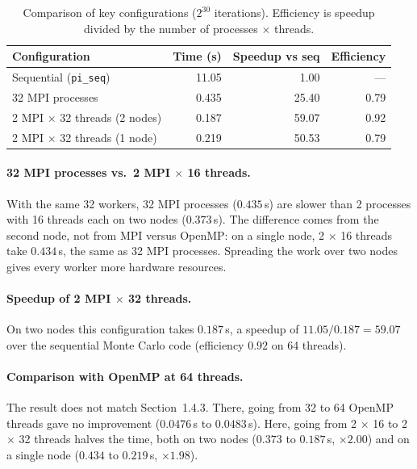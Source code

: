 \documentclass[11pt,a4paper]{article}
\begin{document}
\begin{table}[H]
\centering
\begin{tabular}{lrrr}
\toprule
\textbf{Configuration} & \textbf{Time (s)} & \textbf{Speedup vs seq} & \textbf{Efficiency} \\
\midrule
Sequential (\texttt{pi\_seq})              & 11.05  & 1.00  & --- \\
32 MPI processes                           &  0.435 & 25.40 & 0.79 \\
2 MPI $\times$ 32 threads (2 nodes)        &  0.187 & 59.07 & 0.92 \\
2 MPI $\times$ 32 threads (1 node)         &  0.219 & 50.53 & 0.79 \\
\bottomrule
\end{tabular}
\caption{Comparison of key configurations ($2^{30}$ iterations). Efficiency is speedup divided by the number of processes $\times$ threads.}
\label{tab:summary}
\end{table}

\paragraph{32 MPI processes vs.\ 2 MPI $\times$ 16 threads.} With the same 32 workers, 32 MPI processes ($0.435$\,s) are slower than 2 processes with 16 threads each on two nodes ($0.373$\,s). The difference comes from the second node, not from MPI versus OpenMP: on a single node, 2 $\times$ 16 threads take $0.434$\,s, the same as 32 MPI processes. Spreading the work over two nodes gives every worker more hardware resources.

\paragraph{Speedup of 2 MPI $\times$ 32 threads.} On two nodes this configuration takes $0.187$\,s, a speedup of $11.05/0.187 = 59.07$ over the sequential Monte Carlo code (efficiency $0.92$ on 64 threads).

\paragraph{Comparison with OpenMP at 64 threads.} The result does not match Section~1.4.3. There, going from 32 to 64 OpenMP threads gave no improvement ($0.0476$\,s to $0.0483$\,s). Here, going from 2 $\times$ 16 to 2 $\times$ 32 threads halves the time, both on two nodes ($0.373$ to $0.187$\,s, $\times 2.00$) and on a single node ($0.434$ to $0.219$\,s, $\times 1.98$).
\end{document}

